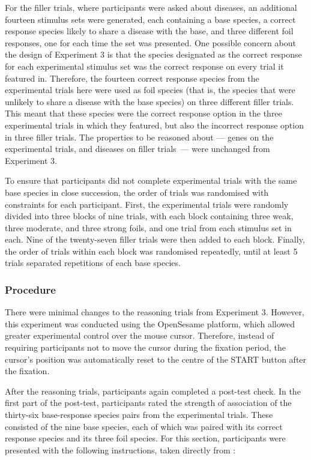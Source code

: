 For the filler trials, where participants were asked about diseases,
an additional fourteen stimulus sets were generated,
each containing a base species,
a correct response species likely to share a disease with the base,
and three different foil responses, one for each time the set was presented.
One possible concern about the design of Experiment 3
is that the species designated as the correct response
for each experimental stimulus set
was the correct response on every trial it featured in.
Therefore, the fourteen correct response species from the experimental trials here
were used as foil species (that is, the species that
were unlikely to share a disease with the base species)
on three different filler trials.
This meant that these species were the correct response option
in the three experimental trials in which they featured,
but also the incorrect response option in three filler trials.
The properties to be reasoned about ---
genes on the experimental trials,
and diseases on filler trials~---
were unchanged from Experiment 3.

To ensure that participants did not complete
experimental trials with the same base species in close succession,
the order of trials was randomised with constraints for each participant.
First, the experimental trials were randomly divided
into three blocks of nine trials,
with each block containing
three weak, three moderate, and three strong foils,
and one trial from each stimulus set in each.
Nine of the twenty-seven filler trials were then added to each block.
Finally, the order of trials within each block was randomised repeatedly,
until at least 5 trials separated repetitions of each base species.

\subsubsection{Procedure}

There were minimal changes to the reasoning trials from Experiment 3.
However, this experiment was conducted using the OpenSesame platform,
which allowed greater experimental control over the mouse cursor.
Therefore, instead of requiring participants
not to move the cursor during the fixation period,
the cursor's position was automatically reset
to the centre of the START button after the fixation.

After the reasoning trials, participants again completed a post-test check.
In the first part of the post-test, participants rated the strength of association
of the thirty-six base-response species pairs from the experimental trials.
These consisted of the nine base species,
each of which was paired with its correct response species
and its three foil species.
For this section, participants were presented with the following instructions,
taken directly from  \citet[][Chapter 2, p. 60]{Crisp-Bright2010}:


